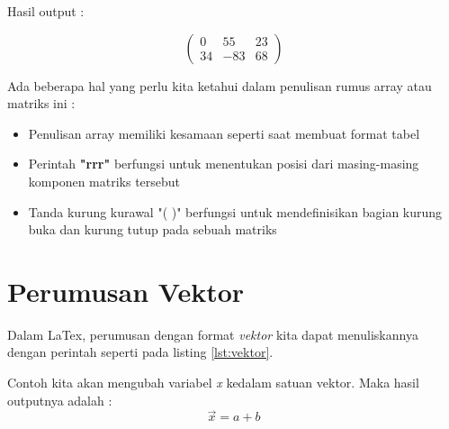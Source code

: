 Hasil output :

\begin{displaymath}
\left (
\begin{array}{rrr}
0 & 55 & 23 \\
34 & -83 & 68 \end{array}
\right )
\end{displaymath}

Ada beberapa hal yang perlu kita ketahui dalam penulisan rumus array atau matriks ini :
\begin{itemize}
\item Penulisan array memiliki kesamaan seperti saat membuat format tabel
\item Perintah \textbf{"rrr"} berfungsi untuk menentukan posisi dari masing-masing komponen matriks tersebut
\item Tanda kurung kurawal "( )" berfungsi untuk mendefinisikan bagian kurung buka dan kurung tutup pada sebuah matriks  
\end{itemize}

\section{Perumusan Vektor}
Dalam LaTex, perumusan dengan format \textit{vektor} kita dapat menuliskannya dengan perintah seperti pada listing \ref{lst:vektor}.
 

Contoh kita akan mengubah variabel \textit{x} kedalam satuan vektor. Maka hasil outputnya adalah :
\begin{displaymath}
\vec{x} = a + b
\end{displaymath} 




